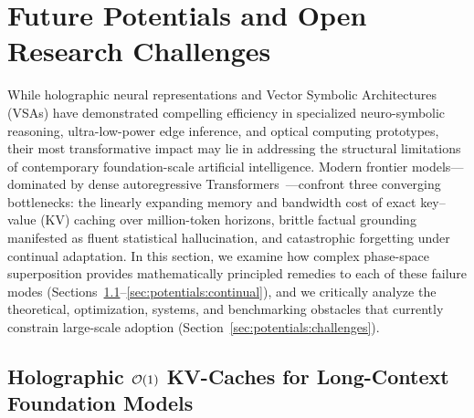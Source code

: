 \section{Future Potentials and Open Research Challenges}\label{sec:potentials}

While holographic neural representations and Vector Symbolic Architectures (VSAs) have demonstrated compelling efficiency in specialized neuro-symbolic reasoning, ultra-low-power edge inference, and optical computing prototypes, their most transformative impact may lie in addressing the structural limitations of contemporary foundation-scale artificial intelligence.
Modern frontier models---dominated by dense autoregressive Transformers~\cite{VASWANI_TRANSFORMER}---confront three converging bottlenecks: the linearly expanding memory and bandwidth cost of exact key--value (KV) caching over million-token horizons, brittle factual grounding manifested as fluent statistical hallucination, and catastrophic forgetting under continual adaptation.
In this section, we examine how complex phase-space superposition provides mathematically principled remedies to each of these failure modes (Sections~\ref{sec:potentials:kvcache}--\ref{sec:potentials:continual}), and we critically analyze the theoretical, optimization, systems, and benchmarking obstacles that currently constrain large-scale adoption (Section~\ref{sec:potentials:challenges}).

\subsection{Holographic \texorpdfstring{$\mathcal{O}\!\left(1\right)$}{O(1)} KV-Caches for Long-Context Foundation Models}\label{sec:potentials:kvcache}

